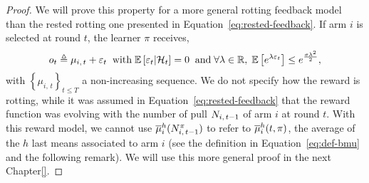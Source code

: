 \begin{proof}
We will prove this property for a more general rotting feedback model than the rested rotting one presented in Equation~\ref{eq:rested-feedback}. If arm $i$ is selected at round $t$, the learner $\pi$ receives,
\[
o_t \triangleq \mu_{i, \, t} + \varepsilon_t  \;\; \text{with}\; \mathbb{E}\left[ \varepsilon_t | \mathcal{H}_t \right]= 0 \;\; \text{and} \; \forall \lambda \in \mathbb{R}, \; \mathbb{E}\left[ e^{\lambda\varepsilon_t}\right] \leq e^{\frac{\sigma\lambda^2}{2}},
\]
with $\left\{ \mu_{i, \, t}\right\}_{t\leq T}$ a non-increasing sequence. We do not specify how the reward is rotting, while it was assumed in Equation~\ref{eq:rested-feedback} that the reward function was evolving with the number of pull $N_{i,\,t-1}$ of arm $i$ at round $t$. With this reward model, we cannot use $\overline{\mu}^{h}_{i}(N_{i,\,t-1}^{\pi})$ to refer to $\overline{\mu}_i^h(t,\pi)$, the average of the $h$ last means associated to arm $i$ (see the definition in Equation~\ref{eq:def-bmu} and the following remark). We will use this more general proof in the next Chapter\ref{}. %


\end{proof}
